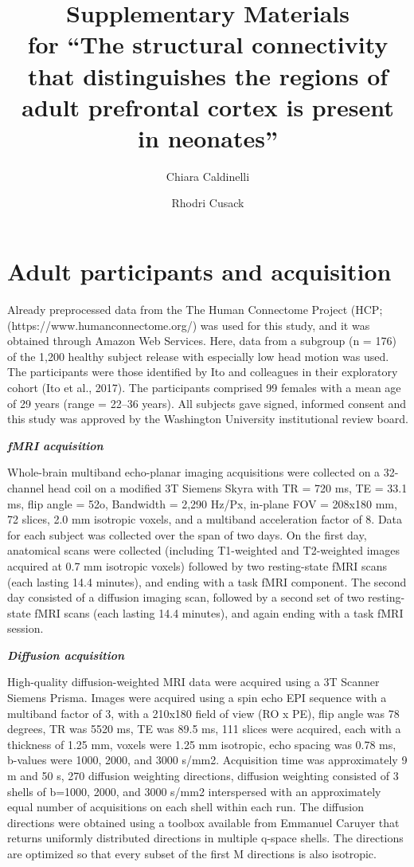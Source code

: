 \documentclass[11pt]{article}
\title{Supplementary Materials\\ \large for ``The structural connectivity that
distinguishes the regions of adult prefrontal cortex is present in neonates''}
\author{Chiara Caldinelli \and Rhodri Cusack}
\date{}
\begin{document}
\maketitle

\section{Adult participants and acquisition}

Already preprocessed data from the The Human Connectome Project (HCP;
(https://www.humanconnectome.org/) was used for this study, and it was
obtained through Amazon Web Services. Here, data from a subgroup (n =
176) of the 1,200 healthy subject release with especially low head
motion was used. The participants were those identified by Ito and
colleagues in their exploratory cohort (Ito et al., 2017). The
participants comprised 99 females with a mean age of 29 years (range =
22--36 years). All subjects gave signed, informed consent and this study
was approved by the Washington University institutional review board.

\textbf{\emph{fMRI acquisition}}

Whole-brain multiband echo-planar imaging acquisitions were collected on
a 32-channel head coil on a modified 3T Siemens Skyra with TR = 720 ms,
TE = 33.1 ms, flip angle = 52o, Bandwidth = 2,290 Hz/Px, in-plane FOV =
208x180 mm, 72 slices, 2.0 mm isotropic voxels, and a multiband
acceleration factor of 8. Data for each subject was collected over the
span of two days. On the first day, anatomical scans were collected
(including T1-weighted and T2-weighted images acquired at 0.7 mm
isotropic voxels) followed by two resting-state fMRI scans (each lasting
14.4 minutes), and ending with a task fMRI component. The second day
consisted of a diffusion imaging scan, followed by a second set of two
resting-state fMRI scans (each lasting 14.4 minutes), and again ending
with a task fMRI session.

\textbf{\emph{Diffusion acquisition}}

High-quality diffusion-weighted MRI data were acquired using a 3T
Scanner Siemens Prisma. Images were acquired using a spin echo EPI
sequence with a multiband factor of 3, with a 210x180 field of view (RO
x PE), flip angle was 78 degrees, TR was 5520 ms, TE was 89.5 ms, 111
slices were acquired, each with a thickness of 1.25 mm, voxels were 1.25
mm isotropic, echo spacing was 0.78 ms, b-values were 1000, 2000, and
3000 s/mm2. Acquisition time was approximately 9 m and 50 s, 270
diffusion weighting directions, diffusion weighting consisted of 3
shells of b=1000, 2000, and 3000 s/mm2 interspersed with an
approximately equal number of acquisitions on each shell within each
run. The diffusion directions were obtained using a toolbox available
from Emmanuel Caruyer that returns uniformly distributed directions in
multiple q-space shells. The directions are optimized so that every
subset of the first M directions is also isotropic.
\end{document}
